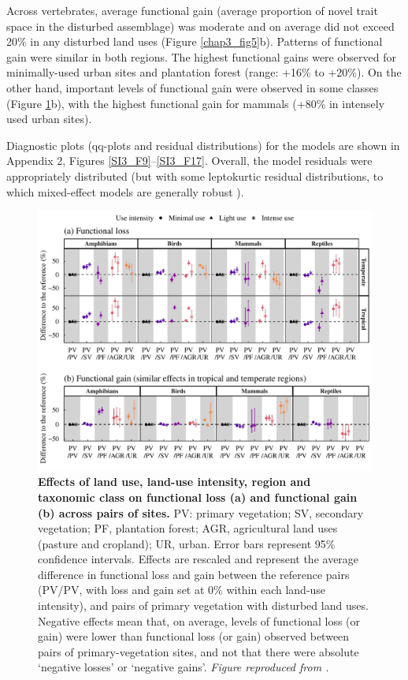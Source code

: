 Across vertebrates, average functional gain (average proportion of novel trait space in the disturbed assemblage) was moderate and on average did not exceed 20\% in any disturbed land uses (Figure \ref{chap3_fig5}b). Patterns of functional gain were similar in both regions. The highest functional gains were observed for minimally-used urban sites and plantation forest (range: +16\% to +20\%). On the other hand, important levels of functional gain were observed in some classes (Figure \ref{chap3_fig6}b), with the highest functional gain for mammals (+80\% in intensely used urban sites).

Diagnostic plots (qq-plots and residual distributions) for the models are shown in Appendix 2, Figures \ref{SI3_F9}–\ref{SI3_F17}. Overall, the model residuals were appropriately distributed (but with some leptokurtic residual distributions, to which mixed-effect models are generally robust \citep{Schielzeth2020}).

\begin{figure}[h!]
\centering
\includegraphics[scale=0.75]{figures/Chapter_FD/Figure6}
\caption[Effects of land use, land-use intensity, region and taxonomic class on functional loss and functional gain across pairs of sites.]{\textbf{Effects of land use, land-use intensity, region and taxonomic class on functional loss (a) and functional gain (b) across pairs of sites.}  PV: primary vegetation; SV, secondary vegetation; PF, plantation forest; AGR, agricultural land uses (pasture and cropland); UR, urban. Error bars represent 95\% confidence intervals. Effects are rescaled and represent the average difference in functional loss and gain between the reference pairs (PV/PV, with loss and gain set at 0\% within each land-use intensity), and pairs of primary vegetation with disturbed land uses. Negative effects mean that, on average, levels of functional loss (or gain) were lower than functional loss (or gain) observed between pairs of primary-vegetation sites, and not that there were absolute `negative losses' or `negative gains'. \textit{Figure reproduced from \citet{Etard2022}.}}
\label{chap3_fig6}
\end{figure}

